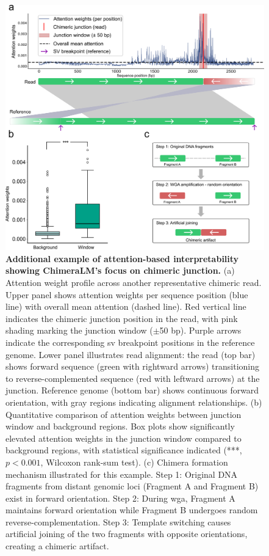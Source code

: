 \documentclass[pdflatex,sn-nature]{sn-jnl}%
\theoremstyle{thmstyleone}%
\theoremstyle{thmstyletwo}%
\theoremstyle{thmstylethree}%
\begin{document}
\begin{figure}[!ht]
	\begin{center}
		\includegraphics[width=\textwidth]{final_figures/sf3}
	\end{center}
	\caption{{\bf Additional example of attention-based interpretability showing ChimeraLM's focus on chimeric junction.}
		(a) Attention weight profile across another representative chimeric read. Upper panel shows attention weights per sequence position (blue line) with overall mean attention (dashed line). Red vertical line indicates the chimeric junction position in the read, with pink shading marking the junction window ($\pm$50 bp). Purple arrows indicate the corresponding \gls{sv} breakpoint positions in the reference genome. Lower panel illustrates read alignment: the read (top bar) shows forward sequence (green with rightward arrows) transitioning to reverse-complemented sequence (red with leftward arrows) at the junction. Reference genome (bottom bar) shows continuous forward orientation, with gray regions indicating alignment relationships.
		(b) Quantitative comparison of attention weights between junction window and background regions. Box plots show significantly elevated attention weights in the junction window compared to background regions, with statistical significance indicated (***, $p < 0.001$, Wilcoxon rank-sum test).
		(c) Chimera formation mechanism illustrated for this example. Step 1: Original DNA fragments from distant genomic loci (Fragment A and Fragment B) exist in forward orientation. Step 2: During \gls{wga}, Fragment A maintains forward orientation while Fragment B undergoes random reverse-complementation. Step 3: Template switching causes artificial joining of the two fragments with opposite orientations, creating a chimeric artifact.}\label{fig:sf3}
\end{figure}
\end{document}
